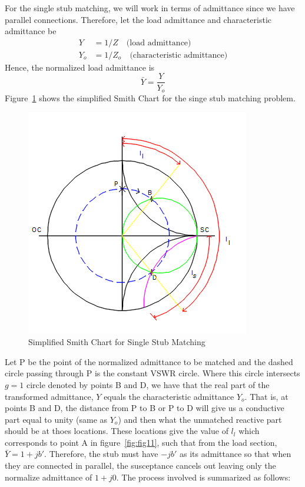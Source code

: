 For the single stub matching, we will work in terms of admittance since we have parallel connections. Therefore, let the load admittance and characteristic admittance be
\begin{align*}
Y &= 1/Z\quad\text{(load admittance)}\\
Y_o &= 1/Z_o\quad\text{(characteristic admittance)}
\end{align*}
Hence, the normalized load admittance is
\begin{equation*} 
\bar{Y}=\frac{Y}{Y_o} 
\end{equation*}
Figure~\ref{fig:qwtch} shows the simplified Smith Chart for the singe stub matching problem.
\begin{figure}[h]
\centering
\includegraphics[width=1\linewidth]{./graphics/qwtch}
\caption{Simplified Smith Chart for Single Stub Matching}
\label{fig:qwtch}
\end{figure}
Let P be the point of the normalized admittance to be matched and the dashed circle passing through P is the constant VSWR circle. Where this circle intersects $g = 1$ circle denoted by points B and D, we have that the real part of the transformed admittance, $Y$ equals the characteristic admittance $Y_o$. That is, at points B and D, the distance from P to B or P to D will give us a conductive part equal to unity (same as $Y_o$) and then what the unmatched reactive part should be at thoes locations. These locations give the value of $l_l$ which corresponds to point A in figure~\ref{fig:fig11}, such that from the load section, $\bar{Y} = 1 + jb'$. Therefore, the stub must have $-jb'$ as its admittance so that when they are connected in parallel, the susceptance cancels out leaving only the normalize admittance of $1 + j0$. The process involved is summarized as follows:
